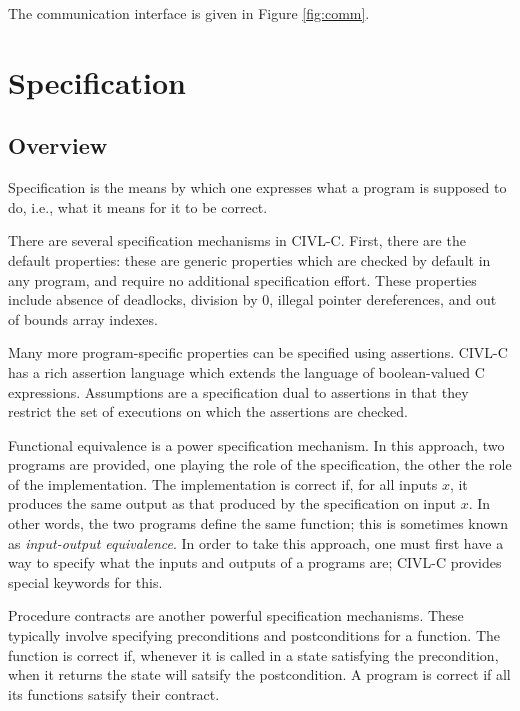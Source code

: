 The communication interface is given in Figure \ref{fig:comm}.


\chapter{Specification}

\section{Overview}

Specification is the means by which one expresses what a program is
supposed to do, i.e., what it means for it to be correct.

There are several specification mechanisms in CIVL-C. First, there are
the default properties: these are generic properties which are checked
by default in any program, and require no additional specification
effort. These properties include absence of deadlocks, division by 0,
illegal pointer dereferences, and out of bounds array indexes.

Many more program-specific properties can be specified using
assertions. CIVL-C has a rich assertion language which extends the
language of boolean-valued C expressions. Assumptions are a
specification dual to assertions in that they restrict the set
of executions on which the assertions are checked.

Functional equivalence is a power specification mechanism. In this
approach, two programs are provided, one playing the role of the
specification, the other the role of the implementation. The
implementation is correct if, for all inputs $x$, it produces the same
output as that produced by the specification on input $x$. In other
words, the two programs define the same function; this is sometimes
known as \emph{input-output equivalence}. In order to take this
approach, one must first have a way to specify what the inputs and
outputs of a programs are; CIVL-C provides special keywords for this.

Procedure contracts are another powerful specification mechanisms.
These typically involve specifying preconditions and postconditions
for a function. The function is correct if, whenever it is called in a
state satisfying the precondition, when it returns the state will
satsify the postcondition. A program is correct if all its functions
satsify their contract.

